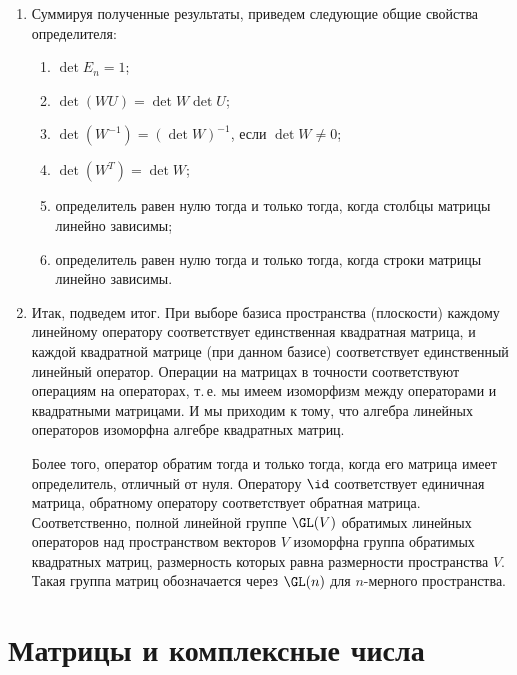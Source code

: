 \begin{enumerate}
\item Суммируя полученные результаты, приведем следующие общие свойства определителя:
\begin{enumerate}[{\bf Det}1]
\item $\det E_n=1$;
\item $\det(WU)=\det W\det U$;
\item $\det(W^{-1}) = (\det W)^{-1}$, если $\det W\ne 0$;
\item $\det(W^T) = \det W$;
\item определитель равен нулю тогда и только тогда, когда столбцы матрицы линейно зависимы;
\item определитель равен нулю тогда и только тогда, когда строки матрицы линейно зависимы.
\end{enumerate}

\item Итак, подведем итог. При выборе базиса пространства (плоскости) каждому линейному оператору соответствует единственная квадратная матрица, и каждой квадратной матрице (при данном базисе) соответствует единственный линейный оператор. Операции на матрицах в точности соответствуют операциям на операторах, т.\,е. мы имеем изоморфизм между операторами и квадратными матрицами. 
И мы приходим к тому, что алгебра линейных операторов изоморфна алгебре квадратных матриц.

Более того, оператор обратим тогда и только тогда, когда его матрица имеет определитель, отличный от нуля. Оператору $\id$ соответствует единичная матрица, обратному оператору соответствует обратная матрица. Соответственно, полной линейной группе $\GL(V)$ обратимых линейных операторов над пространством векторов $V$ изоморфна группа обратимых квадратных матриц, размерность которых равна размерности пространства $V$. Такая группа матриц обозначается через $\GL(n)$ для $n$-мерного пространства.
\end{enumerate}


\section{Матрицы и комплексные числа}




